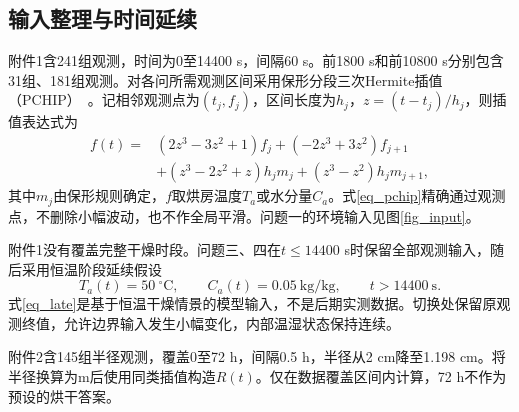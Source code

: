 \subsection{输入整理与时间延续}
附件1含241组观测，时间为0至14400 s，间隔60 s。前1800 s和前10800 s分别包含31组、181组观测。对各问所需观测区间采用保形分段三次Hermite插值（PCHIP）~\cite{pchip}。记相邻观测点为$(t_j,f_j)$，区间长度为$h_j$，$z=(t-t_j)/h_j$，则插值表达式为
\begin{equation}\label{eq_pchip}
\begin{split}
f(t)={}&(2z^3-3z^2+1)f_j+(-2z^3+3z^2)f_{j+1}\\
&+(z^3-2z^2+z)h_jm_j+(z^3-z^2)h_jm_{j+1},
\end{split}
\end{equation}
其中$m_j$由保形规则确定，$f$取烘房温度$T_a$或水分量$C_a$。式\eqref{eq_pchip}精确通过观测点，不删除小幅波动，也不作全局平滑。问题一的环境输入见图\ref{fig_input}。

附件1没有覆盖完整干燥时段。问题三、四在$t\le14400$ s时保留全部观测输入，随后采用恒温阶段延续假设
\begin{equation}\label{eq_late}
T_a(t)=50\ ^\circ\mathrm C,\qquad C_a(t)=0.05\ \mathrm{kg/kg},\qquad t>14400\ \mathrm s.
\end{equation}
式\eqref{eq_late}是基于恒温干燥情景的模型输入，不是后期实测数据。切换处保留原观测终值，允许边界输入发生小幅变化，内部温湿状态保持连续。

附件2含145组半径观测，覆盖0至72 h，间隔0.5 h，半径从2 cm降至1.198 cm。将半径换算为m后使用同类插值构造$R(t)$。仅在数据覆盖区间内计算，72 h不作为预设的烘干答案。
\FloatBarrier
